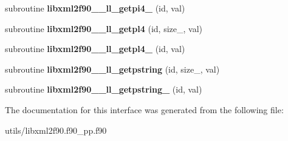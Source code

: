 \begin{DoxyCompactItemize}
\item 
\hypertarget{interfacelibxml2f90__interface__module_1_1libxml2f90____getpid_a349175643652c5565972552050185a27}{
subroutine {\bfseries libxml2f90\_\-\_\-ll\_\-getpi4\_\-} (id, val)}
\label{interfacelibxml2f90__interface__module_1_1libxml2f90____getpid_a349175643652c5565972552050185a27}

\item 
\hypertarget{interfacelibxml2f90__interface__module_1_1libxml2f90____getpid_a748e0f1d1f15acf61515e4babc1fcb36}{
subroutine {\bfseries libxml2f90\_\-\_\-ll\_\-getpl4} (id, size\_\-, val)}
\label{interfacelibxml2f90__interface__module_1_1libxml2f90____getpid_a748e0f1d1f15acf61515e4babc1fcb36}

\item 
\hypertarget{interfacelibxml2f90__interface__module_1_1libxml2f90____getpid_a149bf2528e9e1834306990ff22d6f1e9}{
subroutine {\bfseries libxml2f90\_\-\_\-ll\_\-getpl4\_\-} (id, val)}
\label{interfacelibxml2f90__interface__module_1_1libxml2f90____getpid_a149bf2528e9e1834306990ff22d6f1e9}

\item 
\hypertarget{interfacelibxml2f90__interface__module_1_1libxml2f90____getpid_ab2a74ea42737dfc0388e8b2e3211a251}{
subroutine {\bfseries libxml2f90\_\-\_\-ll\_\-getpstring} (id, size\_\-, val)}
\label{interfacelibxml2f90__interface__module_1_1libxml2f90____getpid_ab2a74ea42737dfc0388e8b2e3211a251}

\item 
\hypertarget{interfacelibxml2f90__interface__module_1_1libxml2f90____getpid_ab7c0ca8e53607453ec3e7c244ca9588d}{
subroutine {\bfseries libxml2f90\_\-\_\-ll\_\-getpstring\_\-} (id, val)}
\label{interfacelibxml2f90__interface__module_1_1libxml2f90____getpid_ab7c0ca8e53607453ec3e7c244ca9588d}

\end{DoxyCompactItemize}


The documentation for this interface was generated from the following file:\begin{DoxyCompactItemize}
\item 
utils/libxml2f90.f90\_\-pp.f90\end{DoxyCompactItemize}
